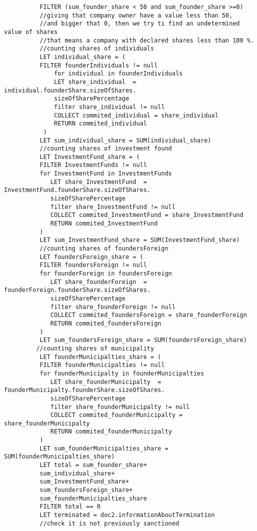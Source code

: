 \begin{enumerate}
\begin{verbatim}
	      FILTER (sum_founder_share < 50 and sum_founder_share >=0)
	      //giving that company owner have a value less than 50, 
	      //and bigger that 0, then we try ti find an undetermined value of shares
	      //that means a company with declared shares less than 100 %. 
	      //counting shares of individuals
	      LET individual_share = (
	      FILTER founderIndividuals != null
	          for individual in founderIndividuals
	          LET share_individual  = individual.founderShare.sizeOfShares.
	          sizeOfSharePercentage
	          filter share_individual != null
	          COLLECT commited_individual = share_individual
	          RETURN commited_individual
	       )
	      LET sum_individual_share = SUM(individual_share)
	      //counting shares of investment found
	      LET InvestmentFund_share = (
	      FILTER InvestmentFunds != null
	      for InvestmentFund in InvestmentFunds
	         LET share_InvestmentFund  = InvestmentFund.founderShare.sizeOfShares.
	         sizeOfSharePercentage
	         filter share_InvestmentFund != null
	         COLLECT commited_InvestmentFund = share_InvestmentFund
	         RETURN commited_InvestmentFund
	      )
	      LET sum_InvestmentFund_share = SUM(InvestmentFund_share)
	      //counting shares of foundersForeign
	      LET foundersForeign_share = (
	      FILTER foundersForeign != null
	      for founderForeign in foundersForeign
	         LET share_founderForeign  = founderForeign.founderShare.sizeOfShares.
	         sizeOfSharePercentage
	         filter share_founderForeign != null
	         COLLECT commited_foundersForeign = share_founderForeign
	         RETURN commited_foundersForeign
	      )
	      LET sum_foundersForeign_share = SUM(foundersForeign_share)
	     //counting shares of municipality
	      LET founderMunicipalties_share = (
	      FILTER founderMunicipalties != null
	      for founderMunicipalty in founderMunicipalties
	         LET share_founderMunicipalty  = founderMunicipalty.founderShare.sizeOfShares.
	         sizeOfSharePercentage
	         filter share_founderMunicipalty != null
	         COLLECT commited_founderMunicipalty = share_founderMunicipalty
	         RETURN commited_founderMunicipalty
	      )
	      LET sum_founderMunicipalties_share = SUM(founderMunicipalties_share)
	      LET total = sum_founder_share+
	      sum_individual_share+
	      sum_InvestmentFund_share+
	      sum_foundersForeign_share+
	      sum_founderMunicipalties_share
	      FILTER total == 0
	      LET terminated = doc2.informationAboutTermination
	      //check it is not previously sanctioned

\end{verbatim}
\end{enumerate}
